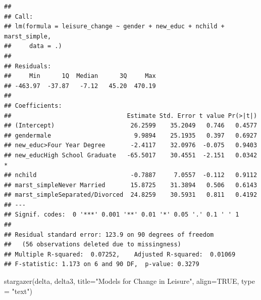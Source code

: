 \documentclass[
]{article}
\newenvironment{Shaded}{\begin{snugshade}}{\end{snugshade}}
\newcommand{\AttributeTok}[1]{\textcolor[rgb]{0.77,0.63,0.00}{#1}}
\newcommand{\ConstantTok}[1]{\textcolor[rgb]{0.00,0.00,0.00}{#1}}
\newcommand{\FunctionTok}[1]{\textcolor[rgb]{0.00,0.00,0.00}{#1}}
\newcommand{\NormalTok}[1]{#1}
\newcommand{\StringTok}[1]{\textcolor[rgb]{0.31,0.60,0.02}{#1}}
\begin{document}
\begin{verbatim}
## 
## Call:
## lm(formula = leisure_change ~ gender + new_educ + nchild + marst_simple, 
##     data = .)
## 
## Residuals:
##     Min      1Q  Median      3Q     Max 
## -463.97  -37.87   -7.12   45.20  470.19 
## 
## Coefficients:
##                                Estimate Std. Error t value Pr(>|t|)  
## (Intercept)                     26.2599    35.2049   0.746   0.4577  
## gendermale                       9.9894    25.1935   0.397   0.6927  
## new_educ>Four Year Degree       -2.4117    32.0976  -0.075   0.9403  
## new_educHigh School Graduate   -65.5017    30.4551  -2.151   0.0342 *
## nchild                          -0.7887     7.0557  -0.112   0.9112  
## marst_simpleNever Married       15.8725    31.3894   0.506   0.6143  
## marst_simpleSeparated/Divorced  24.8259    30.5931   0.811   0.4192  
## ---
## Signif. codes:  0 '***' 0.001 '**' 0.01 '*' 0.05 '.' 0.1 ' ' 1
## 
## Residual standard error: 123.9 on 90 degrees of freedom
##   (56 observations deleted due to missingness)
## Multiple R-squared:  0.07252,    Adjusted R-squared:  0.01069 
## F-statistic: 1.173 on 6 and 90 DF,  p-value: 0.3279
\end{verbatim}

\begin{Shaded}
\begin{Highlighting}[]
\FunctionTok{stargazer}\NormalTok{(delta, delta3, }\AttributeTok{title=}\StringTok{"Models for Change in Leisure"}\NormalTok{, }\AttributeTok{align=}\ConstantTok{TRUE}\NormalTok{, }\AttributeTok{type =} \StringTok{"text"}\NormalTok{)}
\end{Highlighting}
\end{Shaded}
\end{document}
